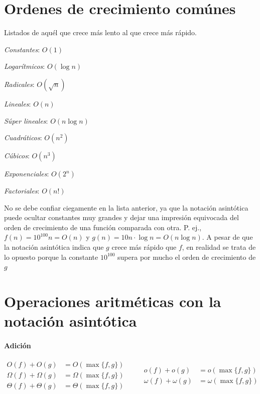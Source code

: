 
\newpage
\section{Ordenes de crecimiento comúnes}

Listados de aquél que crece más lento al que crece más rápido.

\begin{enumerate}
  \begin{multicols}{2}
    \item \emph{Constantes}: \(O(1)\)
    \item \emph{Logarítmicos}: \(O(\log n)\)
    \item \emph{Radicales}: \(O(\sqrt{n})\)
    \item \emph{Lineales}: \(O(n)\)
    \item \emph{Súper lineales}: \(O(n\log n)\)
    \item \emph{Cuadráticos}: \(O(n^{2})\)
    \item \emph{Cúbicos}: \(O(n^{3})\)
    \item \emph{Exponenciales}: \(O(2^{n})\)
    \item \emph{Factoriales}: \(O(n!)\)
  \end{multicols}
\end{enumerate}

No se debe confiar ciegamente en la lista anterior, ya que la notación asintótica puede ocultar constantes muy grandes y dejar una impresión equivocada del orden de crecimiento de una función comparada con otra.
P. ej., \(f(n)=10^{100}n=O(n)\) y \(g(n)=10n\cdot\log n=O(n\log n)\). 
A pesar de que la notación asintótica indica que \(g\) crece más rápido que \(f\), en realidad se trata de lo opuesto porque la constante \(10^{100}\) supera por mucho el orden de crecimiento de \(g\)

\section{Operaciones aritméticas con la notación asintótica}

\paragraph{Adición}
  \[
  \begin{aligned}
      O(f)+O(g) &= O(\max\{f,g\})\\
      \Omega(f)+\Omega(g) &= \Omega(\max\{f,g\})\\
      \Theta(f)+\Theta(g) &= \Theta(\max\{f,g\})
  \end{aligned}
  \qquad
  \begin{aligned}
      o(f)+o(g) &= o(\max\{f,g\})\\
      \omega(f)+\omega(g) &= \omega(\max\{f,g\})
  \end{aligned}
  \]

